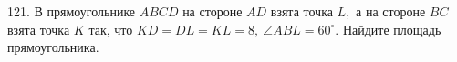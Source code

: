 121. В прямоугольнике $ABCD$ на стороне $AD$ взята точка $L,$ а на стороне $BC$ взята точка $K$ так, что $KD=DL=KL=8,\ \angle ABL=60^\circ.$ Найдите площадь прямоугольника.\\
